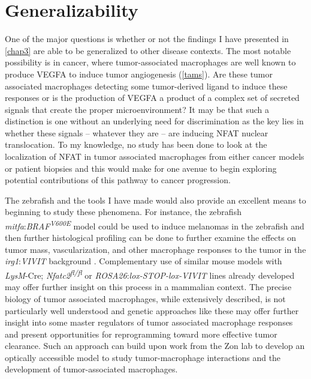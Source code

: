 \section{Generalizability}\label{generalizability}

One of the major questions is whether or not the findings I have presented in \autoref{chap3} are able to be generalized to other disease contexts. The most notable possibility is in cancer, where tumor\hyp{}associated macrophages are well known to produce VEGFA to induce tumor angiogenesis (\autoref{tams}). Are these tumor associated macrophages detecting some tumor\hyp{}derived ligand to induce these responses or is the production of VEGFA a product of a complex set of secreted signals that create the proper microenvironment? It may be that such a distinction is one without an underlying need for discrimination as the key lies in whether these signals -- whatever they are -- are inducing NFAT nuclear translocation. To my knowledge, no study has been done to look at the localization of NFAT in tumor associated macrophages from either cancer models or patient biopsies and this would make for one avenue to begin exploring potential contributions of this pathway to cancer progression. 

The zebrafish and the tools I have made would also provide an excellent means to beginning to study these phenomena. For instance, the zebrafish \textit{mitfa}:\textit{BRAF\textsuperscript{V600E}} model could be used to induce melanomas in the zebrafish and then further histological profiling can be done to further examine the effects on tumor mass, vascularization, and other macrophage responses to the tumor in the \textit{irg1}:\textit{VIVIT} background \citep{Patton2005, Brewer2022}. Complementary use of similar mouse models with \textit{LysM}\hyp{}Cre; \textit{Nfatc2\textsuperscript{fl/fl}} or \textit{ROSA26}:\textit{lox\hyp{}STOP\hyp{}lox\hyp{}VIVIT} lines already developed may offer further insight on this process in a mammalian context. The precise biology of tumor associated macrophages, while extensively described, is not particularly well understood and genetic approaches like these may offer further insight into some master regulators of tumor associated macrophage responses and present opportunities for reprogramming toward more effective tumor clearance. Such an approach can build upon work from the Zon lab to develop an optically accessible model to study tumor\hyp{}macrophage interactions and the development of tumor\hyp{}associated macrophages.

